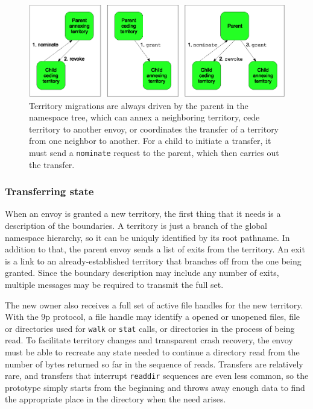 \begin{figure}[tp]
\centering
\includegraphics[width=.8\textwidth]{figures/grant-topdown}
\caption[Types of territory migrations]{Territory migrations are always driven by the parent in the namespace tree, which can annex a neighboring territory, cede territory to another envoy, or coordinates the transfer of a territory from one neighbor to another. For a child to initiate a transfer, it must send a \texttt{nominate} request to the parent, which then carries out the transfer.}
\label{fig:grant-topdown}
\end{figure}

\subsubsection{Transferring state}\label{sec:migrating-state}

When an envoy is granted a new territory, the first thing that it needs is a description of the boundaries. A territory is just a branch of the global namespace hierarchy, so it can be uniquly identified by its root pathname. In addition to that, the parent envoy sends a list of exits from the territory. An exit is a link to an already-established territory that branches off from the one being granted. Since the boundary description may include any number of exits, multiple messages may be required to transmit the full set.

The new owner also receives a full set of active file handles for the new territory. With the 9p protocol, a file handle may identify a opened or unopened files, file or directories used for \texttt{walk} or \texttt{stat} calls, or directories in the process of being read. To facilitate territory changes and transparent crash recovery, the envoy must be able to recreate any state needed to continue a directory read from the number of bytes returned so far in the sequence of reads. Transfers are relatively rare, and transfers that interrupt \texttt{readdir} sequences are even less common, so the prototype simply starts from the beginning and throws away enough data to find the appropriate place in the directory when the need arises.

